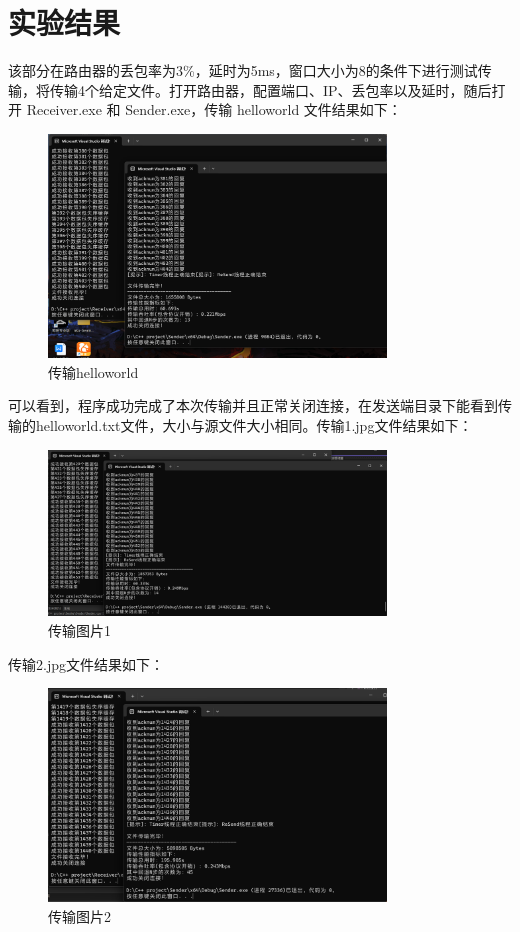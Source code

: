 \documentclass[UTF8,a4paper,10pt]{ctexart}
\begin{document}
\section{实验结果}
该部分在路由器的丢包率为3\%，延时为5ms，窗口大小为8的条件下进行测试传输，将传输4个给定文件。打开路由器，配置端口、IP、丢包率以及延时，随后打开 Receiver.exe 和 Sender.exe，传输 helloworld 文件结果如下：
\begin{figure}[H]
    \centering
\includegraphics[width=0.8\textwidth]{img/传输helloworld.png}
    \caption{传输helloworld}
\end{figure}
可以看到，程序成功完成了本次传输并且正常关闭连接，在发送端目录下能看到传输的helloworld.txt文件，大小与源文件大小相同。传输1.jpg文件结果如下：
\begin{figure}[H]
    \centering
\includegraphics[width=0.8\textwidth]{img/传输图片1.png}
    \caption{传输图片1}
\end{figure}
传输2.jpg文件结果如下：
\begin{figure}[H]
    \centering
\includegraphics[width=0.8\textwidth]{img/传输图片2.png}
    \caption{传输图片2}
\end{figure}
\end{document}
